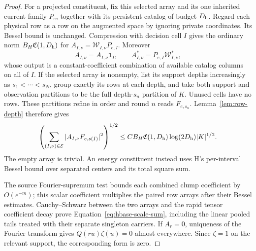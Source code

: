 \begin{proof}
For a projected constituent, fix this selected array and its one
inherited current family \(P_e\), together with its persistent
catalog of budget \(D_{\rm h}\).  Regard each physical row as a row
on the augmented space by ignoring private coordinates.  Its Bessel
bound is unchanged.  Compression with decision cell \(I\) gives the
ordinary norm \(B_H\mathfrak C(1,D_{\rm h})\) for
\(A_{I,\nu}=\mathcal W_{I,\nu}P_{e,I}\).  Moreover
\[
 A_{I,\nu}=A_{I,\nu}\mathbf1_I,\qquad
 A_{I,\nu}^*=P_{e,I}\mathcal W_{I,\nu}^*,
\]
whose output is a constant-coefficient combination of available
catalog columns on all of \(I\).  If the selected array is nonempty,
list its support depths increasingly as \(s_1<\cdots<s_N\), group
exactly its rows at each depth, and take both support and observation
partitions to be the full depth-\(s_n\) partition of \(K\).
Unused cells have no rows.  These partitions refine in order and
round \(n\) reads \(F_{e,s_n}\).  Lemma~\ref{lem:row-depth} therefore
gives
\begin{equation}
 \left(\sum_{(I,\nu)\in\mathcal E}
       |A_{I,\nu}F_{e,s(I)}|^2\right)^{1/2}
 \le C B_H\mathfrak C(1,D_{\rm h})\log(2D_{\rm h})|K|^{1/2}.   \label{eq:hbase-projected-rows}
\end{equation}
The empty array is trivial.  An energy constituent instead uses
H's per-interval Bessel bound over separated centers and its total
square sum.

The source Fourier-supremum test bounds each combined clump
coefficient by \(O(e^{-m})\); this scalar coefficient multiplies
the paired row arrays after their Bessel estimates.  Cauchy--Schwarz
between the two arrays and the rapid tensor coefficient decay prove
Equation~\eqref{eq:hbase-scale-sum}, including the linear pooled
tails treated with their separate singleton carriers.  If \(A_r=0\),
uniqueness of the Fourier transform gives \(Q(ru)\zeta(u)=0\)
almost everywhere.  Since \(\zeta=1\) on the relevant support,
the corresponding form is zero.
\end{proof}

